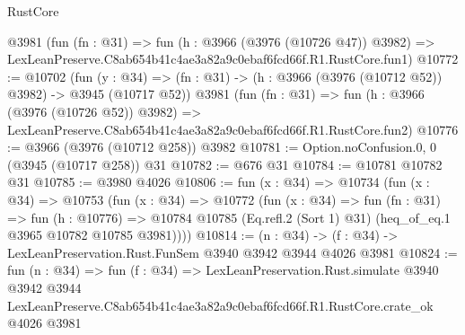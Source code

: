 \begin{lexlean}{RustCore}
\begin{coremodule}
    @3981
    (fun (fn : @31) =>
    fun (h : @3966 (@3976 (@10726 @47)) @3982) =>
    LexLeanPreserve.C8ab654b41c4ae3a82a9c0ebaf6fcd66f.R1.RustCore.fun1)
@10772 := @10702
    (fun (y : @34) => (fn : @31) -> (h : @3966 (@3976 (@10712 @52)) @3982) -> @3945 (@10717 @52))
    @3981
    (fun (fn : @31) =>
    fun (h : @3966 (@3976 (@10726 @52)) @3982) =>
    LexLeanPreserve.C8ab654b41c4ae3a82a9c0ebaf6fcd66f.R1.RustCore.fun2)
@10776 := @3966 (@3976 (@10712 @258)) @3982
@10781 := Option.noConfusion.{0, 0} (@3945 (@10717 @258)) @31
@10782 := @676 @31
@10784 := @10781 @10782 @31
@10785 := @3980 @4026
@10806 := fun (x : @34) =>
  @10734
    (fun (x : @34) =>
    @10753
      (fun (x : @34) =>
      @10772
        (fun (x : @34) =>
        fun (fn : @31) =>
        fun (h : @10776) =>
        @10784 @10785 (Eq.refl.{2} (Sort 1) @31) (heq_of_eq.{1} @3965 @10782 @10785 @3981))))
@10814 := (n : @34) -> (f : @34) -> LexLeanPreservation.Rust.FunSem @3940 @3942 @3944 @4026 @3981
@10824 := fun (n : @34) =>
  fun (f : @34) =>
  LexLeanPreservation.Rust.simulate
    @3940
    @3942
    @3944
    LexLeanPreserve.C8ab654b41c4ae3a82a9c0ebaf6fcd66f.R1.RustCore.crate_ok
    @4026
    @3981
\end{coremodule}
\end{lexlean}
